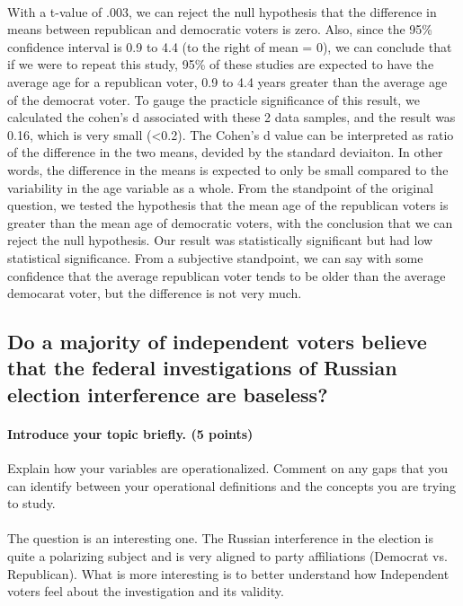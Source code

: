 \documentclass[12pt]{article}
\begin{document}
\paragraph{}
With a t-value of .003, we can reject the null hypothesis that the difference in means between republican and democratic voters is zero. Also, since the 95\% confidence interval is 0.9 to 4.4 (to the right of mean = 0), we can conclude that if we were to repeat this study, 95\% of these studies are expected to have the average age for a republican voter, 0.9 to 4.4 years greater than the average age of the democrat voter.
To gauge the practicle significance of this result, we calculated the cohen's d associated with these 2 data samples, and the result was 0.16, which is very small (<0.2). The Cohen's d value can be interpreted as ratio of the difference in the two means, devided by the standard deviaiton. In other words, the difference in the means is expected to only be small compared to the variability in the age variable as a whole.
From the standpoint of the original question, we tested the hypothesis that the mean age of the republican voters is greater than the mean age of democratic voters, with the conclusion that we can reject the null hypothesis. Our result was statistically significant but had low statistical significance. From a subjective standpoint, we can say with some confidence that the average republican voter tends to be older than the average democarat voter, but the difference is not very much. 

\subsection{Do a majority of independent voters believe that the federal investigations of Russian election interference are baseless?}
\paragraph{Introduce your topic briefly. (5 points)}
Explain how your variables are operationalized. Comment on any gaps that you can identify between your operational definitions and the concepts you are trying to study.
\paragraph{}
The question is an interesting one. The Russian interference in the election is quite a polarizing subject and is very aligned to party affiliations (Democrat vs. Republican). What is more interesting is to better understand how Independent voters feel about the investigation and its validity.
\end{document}
